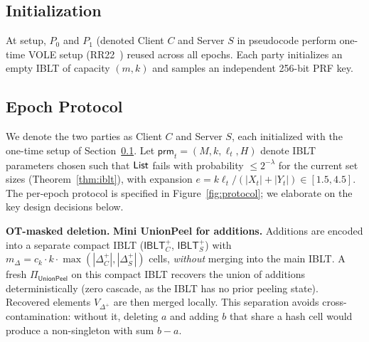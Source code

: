 \subsection{Initialization}
\label{sec:init}

At setup, $P_0$ and $P_1$ (denoted Client $C$ and Server $S$ in pseudocode
perform one-time VOLE setup (RR22~\cite{RR22}) reused across all epochs.
Each party initializes an empty IBLT of capacity $(m, k)$ and samples an
independent 256-bit PRF key.

\subsection{Epoch Protocol}\label{sec:epoch-protocol}

	We denote the two parties as Client $C$ and Server $S$, each initialized with
	the one-time setup of Section~\ref{sec:init}.  Let
	$\mathsf{prm}_t = (M, k, \ell_t, H)$ denote IBLT parameters chosen such that
	$\mathsf{List}$ fails with probability $\leq 2^{-\lambda}$ for the current set sizes
	(Theorem~\ref{thm:iblt}), with expansion $e = k\ell_t / (|X_t| + |Y_t|) \in
	[1.5, 4.5]$.  The per-epoch protocol is specified in
	Figure~\ref{fig:protocol}; we elaborate on the key design decisions below.

	\smallskip\noindent\textbf{OT-masked deletion.}
	\smallskip\noindent\textbf{Mini UnionPeel for additions.}
	Additions are encoded into a separate compact IBLT ($\mathsf{IBLT}^+_C$,
	$\mathsf{IBLT}^+_S$) with $m_{\Delta} = c_k \cdot k \cdot \max(|\Delta^+_C|,
	|\Delta^+_S|)$ cells, \emph{without} merging into the main IBLT.  A fresh
	$\Pi_{\mathsf{UnionPeel}}$ on this compact IBLT recovers the union of
	additions deterministically (zero cascade, as the IBLT has no prior peeling
	state).  Recovered elements $V_{\Delta^+}$ are then merged locally.  This
	separation avoids cross-contamination: without it, deleting $a$ and adding
	$b$ that share a hash cell would produce a non-singleton with sum $b-a$.

